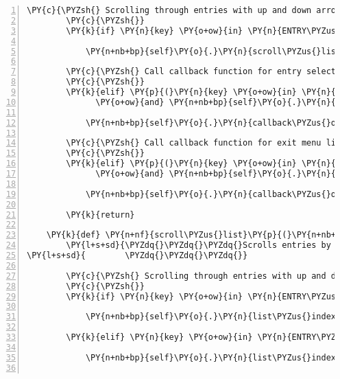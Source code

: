 \begin{Verbatim}[commandchars=\\\{\},numbers=left,firstnumber=1,stepnumber=1]
        \PY{c}{\PYZsh{} Scrolling through entries with up and down arrow keys}
        \PY{c}{\PYZsh{}}
        \PY{k}{if} \PY{n}{key} \PY{o+ow}{in} \PY{n}{ENTRY\PYZus{}DOWN\PYZus{}KEYS} \PY{o+ow}{or} \PY{n}{key} \PY{o+ow}{in} \PY{n}{ENTRY\PYZus{}UP\PYZus{}KEYS}\PY{p}{:}

            \PY{n+nb+bp}{self}\PY{o}{.}\PY{n}{scroll\PYZus{}list}\PY{p}{(}\PY{n}{key}\PY{p}{)}

        \PY{c}{\PYZsh{} Call callback function for entry selected}
        \PY{c}{\PYZsh{}}
        \PY{k}{elif} \PY{p}{(}\PY{n}{key} \PY{o+ow}{in} \PY{n}{SELECT\PYZus{}ENTRY\PYZus{}KEYS}
              \PY{o+ow}{and} \PY{n+nb+bp}{self}\PY{o}{.}\PY{n}{callback\PYZus{}on\PYZus{}entry\PYZus{}selected} \PY{o+ow}{is} \PY{o+ow}{not} \PY{n+nb+bp}{None}\PY{p}{)}\PY{p}{:}

            \PY{n+nb+bp}{self}\PY{o}{.}\PY{n}{callback\PYZus{}on\PYZus{}entry\PYZus{}selected}\PY{p}{(}\PY{n+nb+bp}{self}\PY{p}{)}

        \PY{c}{\PYZsh{} Call callback function for exit menu list}
        \PY{c}{\PYZsh{}}
        \PY{k}{elif} \PY{p}{(}\PY{n}{key} \PY{o+ow}{in} \PY{n}{EXIT\PYZus{}AUDIO\PYZus{}MENU\PYZus{}LIST\PYZus{}KEYS}
              \PY{o+ow}{and} \PY{n+nb+bp}{self}\PY{o}{.}\PY{n}{callback\PYZus{}on\PYZus{}exit} \PY{o+ow}{is} \PY{o+ow}{not} \PY{n+nb+bp}{None}\PY{p}{)}\PY{p}{:}

            \PY{n+nb+bp}{self}\PY{o}{.}\PY{n}{callback\PYZus{}on\PYZus{}exit}\PY{p}{(}\PY{n+nb+bp}{self}\PY{p}{)}

        \PY{k}{return}

    \PY{k}{def} \PY{n+nf}{scroll\PYZus{}list}\PY{p}{(}\PY{n+nb+bp}{self}\PY{p}{,} \PY{n}{key}\PY{p}{)}\PY{p}{:}
        \PY{l+s+sd}{\PYZdq{}\PYZdq{}\PYZdq{}Scrolls entries by decreasing or increasing the list\PYZus{}index.}
\PY{l+s+sd}{        \PYZdq{}\PYZdq{}\PYZdq{}}

        \PY{c}{\PYZsh{} Scrolling through entries with up and down arrow keys}
        \PY{c}{\PYZsh{}}
        \PY{k}{if} \PY{n}{key} \PY{o+ow}{in} \PY{n}{ENTRY\PYZus{}UP\PYZus{}KEYS}\PY{p}{:}

            \PY{n+nb+bp}{self}\PY{o}{.}\PY{n}{list\PYZus{}index} \PY{o}{\PYZhy{}}\PY{o}{=} \PY{l+m+mi}{1}

        \PY{k}{elif} \PY{n}{key} \PY{o+ow}{in} \PY{n}{ENTRY\PYZus{}DOWN\PYZus{}KEYS}\PY{p}{:}

            \PY{n+nb+bp}{self}\PY{o}{.}\PY{n}{list\PYZus{}index} \PY{o}{+}\PY{o}{=} \PY{l+m+mi}{1}


\end{Verbatim}
